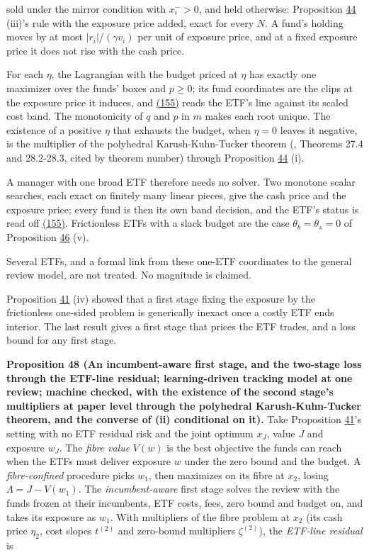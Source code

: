 \documentclass[11pt]{article}
\begin{document}
sold under the mirror condition with \(x^-_i>0\), and held otherwise:
Proposition \hyperref[res:Proposition-44]{44} (iii)'s rule with the exposure price added, exact for
every \(N\). A fund's holding moves by at most \(|r_i|/(\gamma v_i)\) per unit of
exposure price, and at a fixed exposure price it does not rise with the
cash price.

For each \(\eta\), the Lagrangian with the budget priced at \(\eta\) has exactly
one maximizer over the funds' boxes and \(p\geq0\); its fund coordinates are
the clips at the exposure price it induces, and \hyperref[eq:155]{(155)} reads the ETF's
line against its scaled cost band. The monotonicity of \(q\) and \(p\) in \(m\)
makes each root unique. The existence of a positive \(\eta\) that exhausts
the budget, when \(\eta=0\) leaves it negative, is the multiplier of the
polyhedral Karush-Kuhn-Tucker theorem (\cite{rockafellar1970convex},
Theorems 27.4 and 28.2-28.3, cited by theorem number) through
Proposition \hyperref[res:Proposition-44]{44} (i).

A manager with one broad ETF therefore needs no solver. Two monotone
scalar searches, each exact on finitely many linear pieces, give the
cash price and the exposure price; every fund is then its own band
decision, and the ETF's status is read off \hyperref[eq:155]{(155)}. Frictionless ETFs
with a slack budget are the case \(\theta_b=\theta_s=0\) of Proposition \hyperref[res:Proposition-46]{46} (v).

Several ETFs, and a formal link from these one-ETF coordinates to the
general review model, are not treated. No magnitude is claimed.

Proposition \hyperref[res:Proposition-41]{41} (iv) showed that a first stage fixing the exposure by
the frictionless one-sided problem is generically inexact once a
costly ETF ends interior. The last result gives a first stage that
prices the ETF trades, and a loss bound for any first stage.

\label{res:Proposition-48}
\textbf{Proposition 48 (An incumbent-aware first stage, and the two-stage loss through the ETF-line residual; learning-driven tracking model at one review; machine checked, with the existence of the second stage's multipliers at paper level through the polyhedral Karush-Kuhn-Tucker theorem, and the converse of (ii) conditional on it).}
Take Proposition \hyperref[res:Proposition-41]{41}'s setting with no ETF residual risk and the joint
optimum \(x_J\), value \(J\) and exposure \(w_J\). The \emph{fibre value} \(V(w)\) is the
best objective the funds can reach when the ETFs must deliver exposure
\(w\) under the zero bound and the budget. A \emph{fibre-confined} procedure
picks \(w_1\), then maximizes on its fibre at \(x_2\), losing \(\Lambda=J-V(w_1)\). The
\emph{incumbent-aware} first stage solves the review with the funds frozen
at their incumbents, ETF costs, fees, zero bound and budget on, and
takes its exposure as \(w_1\). With multipliers of the fibre problem at
\(x_2\) (its cash price \(\eta_2\), cost slopes \(t^{(2)}\) and zero-bound multipliers
\(\zeta^{(2)}\)), the \emph{ETF-line residual} is
\end{document}
